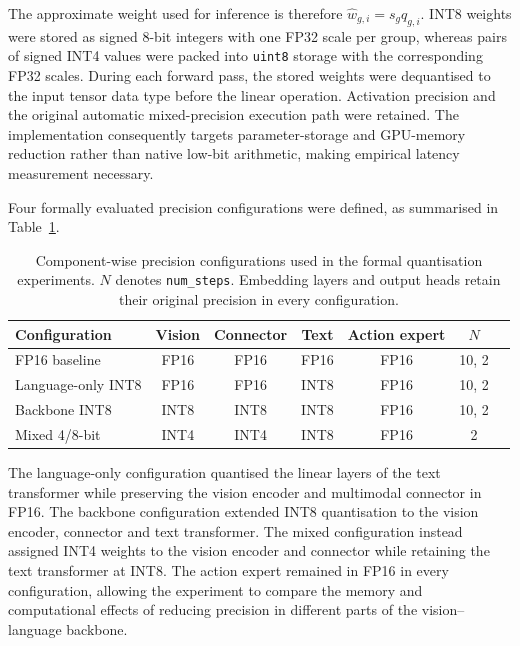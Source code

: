 The approximate weight used for inference is therefore \(\hat{w}_{g,i}=s_gq_{g,i}\). INT8 weights were stored as signed 8-bit integers with one FP32 scale per group, whereas pairs of signed INT4 values were packed into \texttt{uint8} storage with the corresponding FP32 scales. During each forward pass, the stored weights were dequantised to the input tensor data type before the linear operation. Activation precision and the original automatic mixed-precision execution path were retained. The implementation consequently targets parameter-storage and GPU-memory reduction rather than native low-bit arithmetic, making empirical latency measurement necessary.

Four formally evaluated precision configurations were defined, as summarised in Table~\ref{tab:quantisation_configurations}.

\begin{table}
  \centering
  \caption{Component-wise precision configurations used in the formal
  quantisation experiments. \(N\) denotes \texttt{num\_steps}. Embedding layers
  and output heads retain their original precision in every configuration.}
  \label{tab:quantisation_configurations}
  \small
  \begin{tabular}{@{}lcccccc@{}}
    \toprule
    Configuration & Vision & Connector & Text & Action expert & \(N\) \\
    \midrule
    FP16 baseline       & FP16 & FP16 & FP16 & FP16 & 10, 2 \\
    Language-only INT8  & FP16 & FP16 & INT8 & FP16 & 10, 2 \\
    Backbone INT8       & INT8 & INT8 & INT8 & FP16 & 10, 2 \\
    Mixed 4/8-bit       & INT4 & INT4 & INT8 & FP16 & 2 \\
    \bottomrule
  \end{tabular}
\end{table}

The language-only configuration quantised the linear layers of the text transformer while preserving the vision encoder and multimodal connector in FP16. The backbone configuration extended INT8 quantisation to the vision encoder, connector and text transformer. The mixed configuration instead assigned INT4 weights to the vision encoder and connector while retaining the text transformer at INT8. The action expert remained in FP16 in every configuration, allowing the experiment to compare the memory and computational effects of reducing precision in different parts of the vision--language backbone.

